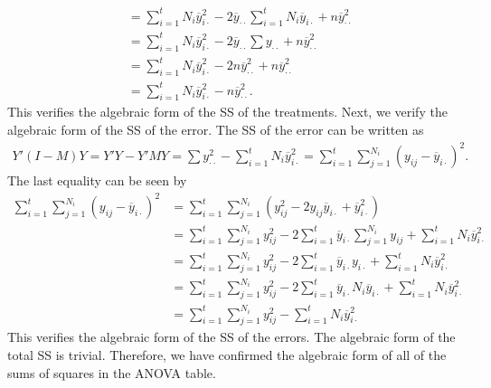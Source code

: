 \documentclass[11pt]{article}
\begin{document}
\begin{itemize}
\begin{align*}
&= \sum_{i=1}^t N_i\overline{y}_{i\cdot}^2 - 2\overline{y}_{\cdot\cdot}\sum_{i=1}^t N_i\overline{y}_{i\cdot} + n\overline{y}_{\cdot\cdot}^2 \\
&= \sum_{i=1}^tN_i\overline{y}_{i\cdot}^2 - 2\overline{y}_{\cdot\cdot}\sum y_{\cdot\cdot} + n\overline{y}_{\cdot\cdot}^2 \\
&= \sum_{i=1}^tN_i\overline{y}_{i\cdot}^2 - 2n\overline{y}_{\cdot\cdot}^2 + n\overline{y}_{\cdot\cdot}^2 \\
&= \sum_{i=1}^tN_i\overline{y}_{i\cdot}^2 - n\overline{y}_{\cdot\cdot}^2.
\end{align*}
This verifies the algebraic form of the SS of the treatments.  Next, we verify the algebraic form of the SS of the error.  The SS of the error can be written as
\begin{align*}
Y'(I - M)Y = Y'Y - Y'MY = \sum y_{\cdot\cdot}^2 - \sum_{i=1}^tN_i\overline{y}_{i\cdot}^2 = \sum_{i=1}^t\sum_{j=1}^{N_i} (y_{ij} - \overline{y}_{i\cdot})^2.
\end{align*}
The last equality can be seen by
\begin{align*}
\sum_{i=1}^t\sum_{j=1}^{N_i} (y_{ij} - \overline{y}_{i\cdot})^2 &= \sum_{i=1}^t\sum_{j=1}^{N_i} (y_{ij}^2 - 2y_{ij}\overline{y}_{i\cdot} + \overline{y}_{i\cdot}^2) \\
&= \sum_{i=1}^t\sum_{j=1}^{N_i} y_{ij}^2 - 2 \sum_{i=1}^t\overline{y}_{i\cdot} \sum_{j=1}^{N_i} y_{ij} + \sum_{i=1}^t N_i\overline{y}_{i\cdot}^2 \\
&= \sum_{i=1}^t\sum_{j=1}^{N_i} y_{ij}^2 - 2\sum_{i=1}^t \overline{y}_{i\cdot}y_{i\cdot} + \sum_{i=1}^t N_i\overline{y}_{i\cdot}^2 \\
&= \sum_{i=1}^t\sum_{j=1}^{N_i} y_{ij}^2 - 2\sum_{i=1}^t \overline{y}_{i\cdot}N_i\overline{y}_{i\cdot} + \sum_{i=1}^t N_i\overline{y}_{i\cdot}^2 \\
&= \sum_{i=1}^t\sum_{j=1}^{N_i} y_{ij}^2 - \sum_{i=1}^t N_i\overline{y}_{i\cdot}^2
\end{align*}
This verifies the algebraic form of the SS of the errors.  The algebraic form of the total SS is trivial.  Therefore, we have confirmed the algebraic form of all of the sums of squares in the ANOVA table.
\end{itemize}
\end{document}
